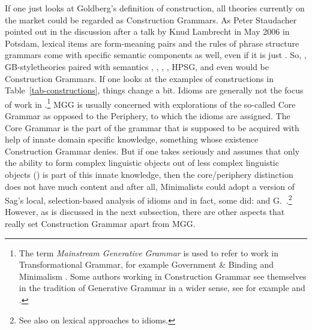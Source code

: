 \documentclass[output=paper,biblatex,babelshorthands,newtxmath,draftmode,colorlinks,citecolor=brown]{langscibook}
\begin{document}
If one just looks at Goldberg's definition of construction, all theories currently on the market could be
regarded as Construction Grammars. As Peter Staudacher pointed out in the discussion after a talk by
Knud Lambrecht in May 2006 in Potsdam, lexical items are form-meaning pairs and the rules of
phrase structure grammars come with specific semantic components as well, even if it is just
.
So, \cg, GB-style\indexgb theories paired with semantics \citep{HK98a-u}, \gpsg, \treeag,
\lfg, HPSG, and even \minimalism would be Construction Grammars. If one looks at the
examples of constructions in Table~\ref{tab-constructions}, things change a bit. Idioms are generally
not the focus of work in .\footnote{
  The term \emph{Mainstream Generative Grammar} is used to refer to work in Transformational
  Grammar, for example Government \& Binding \citep{Chomsky81a} and Minimalism
  \citep{Chomsky95a-u}. Some authors working in Construction Grammar see themselves in the tradition of
  Generative Grammar in a wider sense, see for example  and .%
} MGG is usually concerned with explorations of the so-called Core Grammar as opposed to the Periphery, to which the
idioms are assigned.
The Core Grammar is the part of the grammar that is supposed to be acquired with
help of innate domain specific knowledge, something whose existence Construction Grammar
denies. But if one takes \citet*{HCF2002a} seriously and assumes that only the ability to form complex
linguistic objects out of less complex linguistic objects () is part of this innate knowledge,
then the core/periphery distinction does not have much content and after all, Minimalists could adopt
a version of Sag's local, selection-based analysis of idioms
\citep*{Sag2007a,KSF2015a,KM2019a} and in fact, some did:  and G.\
.\footnote{
  See also  on lexical approaches to idioms.
}
However, as is discussed in the next subsection, there are other aspects that really set Construction Grammar apart from
MGG.
\end{document}
